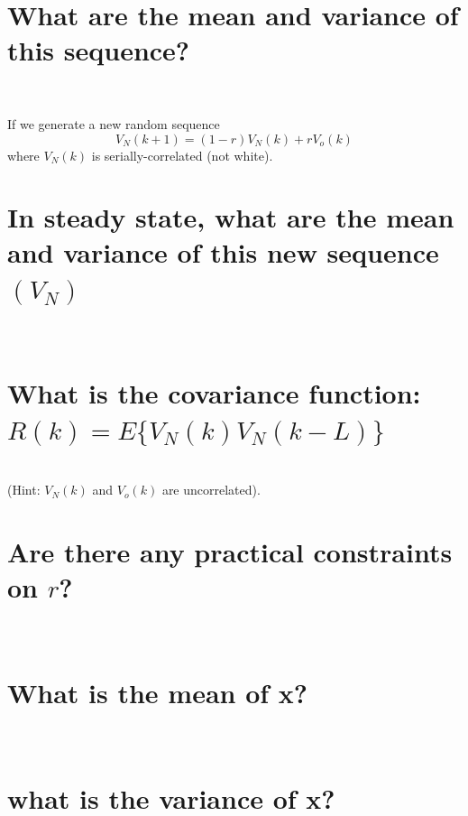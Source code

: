 \documentclass[12pt,letterpaper, onecolumn]{exam}
\begin{document}
\begin{questions}
\begin{parts}
            \part{What are the mean and variance of this sequence?}\\
                \solution
                
            If we generate a new random sequence \[V_N(k+1) = (1 - r)V_N(k) + rV_o(k)\]where $V_N(k)$ is serially-correlated (not white).    
            \part{In steady state, what are the mean and variance of this new sequence $(V_N)$}\\
                \solution
            \part{What is the covariance function: $R(k) = E\{V_N(k)V_N(k-L)\}$}\\
                (Hint: $V_N(k)$ and $V_o(k)$ are uncorrelated).\\
                \solution
            \part{Are there any practical constraints on $r$?}\\
                \solution                
        \end{parts}
\clearpage        
        \begin{parts}
            \part{What is the mean of x?}\\
                \solution
            \part{what is the variance of x?}\\
                \solution
        \end{parts}        
\clearpage    
        \begin{parts}

\end{parts}
\end{questions}
\end{document}
